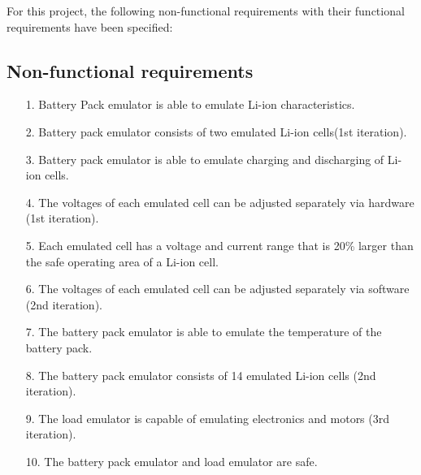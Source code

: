 \IEEEPARstart
{F}{or} this project, the following non-functional requirements with their 
functional requirements have been specified:

\subsection{Non-functional requirements}
\begin{enumerate}
    \item[1.] Battery Pack emulator is able to emulate Li-ion characteristics.
    \item[2.] Battery pack emulator consists of two emulated Li-ion 
    cells(1st iteration).
    \item[3.] Battery pack emulator is able to emulate charging and discharging of
    Li-ion cells.
    \item[4.] The voltages of each emulated cell can be adjusted separately 
    via hardware (1st iteration).
    \item[5.] Each emulated cell has a voltage and current range that is 20\%
    larger than the safe operating area of a Li-ion cell.
    \item[6.] The voltages of each emulated cell can be adjusted separately 
    via software (2nd iteration).
    \item[7.] The battery pack emulator is able to emulate the temperature of 
    the battery pack.
    \item[8.] The battery pack emulator consists of 14 emulated Li-ion 
    cells (2nd iteration). 
    \item[9.] The load emulator is capable of emulating electronics and 
    motors (3rd iteration).
    \item[10.] The battery pack emulator and load emulator are safe. 
  \end{enumerate}

